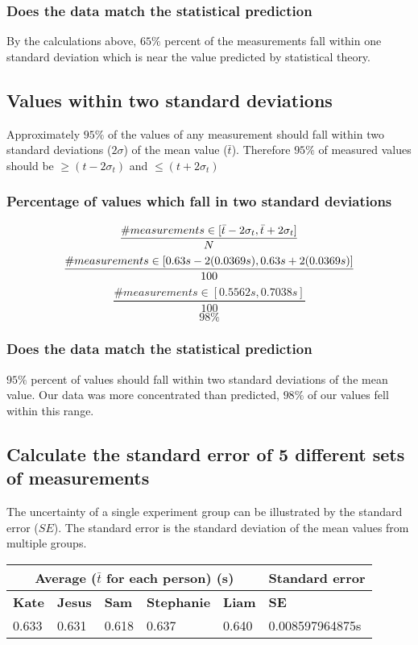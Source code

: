 \documentclass[11pt, letterpaper, includehead]{article}
\begin{document}
\subsubsection{Does the data match the statistical prediction} %
By the calculations above, $65\%$ percent of the measurements fall within one 
standard deviation which is near the value predicted by statistical theory. 

\subsection{Values within two standard deviations} %
Approximately $95\%$ of the values of any measurement should fall within two
standard deviations ($2 \sigma$) of the mean value ($\bar{t}$). Therefore $95\%$ of measured
values should be $\geq (t - 2 \sigma_t)$ and $\leq (t + 2 \sigma_t)$

\subsubsection{Percentage of values which fall in two standard deviations} %
$$\frac{\# measurements \in [\bar{t} - 2\sigma_t, \bar{t} + 2\sigma_t]}{N} \\$$
$$\frac{\# measurements \in [0.63s - 2(0.0369s), 0.63s + 2(0.0369s)]}{100} \\$$
$$\frac{\# measurements \in [0.5562s, 0.7038s]}{100}$$
$$\boxed{98\%}$$

\subsubsection{Does the data match the statistical prediction} %
$95\%$ percent of values should fall within two standard deviations of the mean value.
Our data was more concentrated than predicted, $98\%$ of our values fell within
this range. 

\subsection{Calculate the standard error of 5 different sets of measurements} %

The uncertainty of a single experiment group can be illustrated by the standard
error ($SE$). The standard error is the standard deviation of the mean values
from multiple groups.
\begin{center}
  \begin{tabular}{|   m{2cm}  |  m{2cm}  |  m{2cm}  |  m{2cm}  |  m{2cm}  |  m{3cm} | }
    \hline
    \multicolumn{5}{|c|}{\textbf{Average ($\bar{t}$ for each person) (s)}} & \multicolumn{1}{l|}{\textbf{Standard error}}\\
    \hline
    \textbf{Kate} & \textbf{Jesus} & \textbf{Sam} & \textbf{Stephanie} & \textbf{Liam} & \textbf{SE}  \\
    \hline
    0.633         & 0.631          & 0.618        & 0.637              & 0.640 & 0.008597964875s \\  %
    \hline
  \end{tabular}
\end{center}
\end{document}
